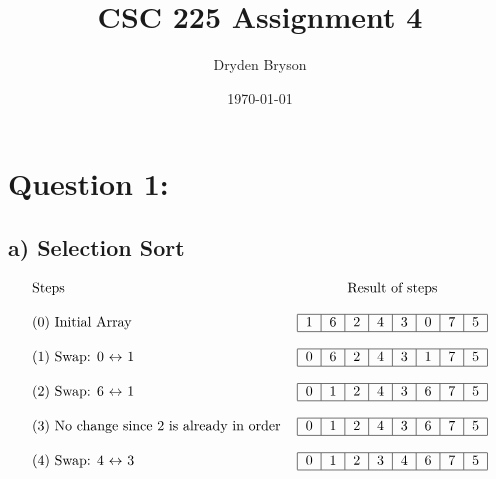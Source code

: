 \documentclass{article}
\title{CSC 225 Assignment 4}
\author{Dryden Bryson}
\date{\today}
\begin{document}
\maketitle
\newpage

\section*{Question 1:}
\subsection*{a) Selection Sort}
\begin{align}
    \begin{tabular}{l c}
        \text{Steps} & \text{Result of steps}\\&\\
        \text{(0) Initial Array\;\;\;\;\;\;\;\;}&\begin{tabular}{|c|c|c|c|c|c|c|c|c|}
            \hline
        1&6&2&4&3&0&7&5\\
            \hline
        \end{tabular}\\&\\
        \text{(1) Swap: 0 $\leftrightarrow$ 1}&\begin{tabular}{|c|c|c|c|c|c|c|c|}
            \hline
        0&6&2&4&3&1&7&5\\
            \hline
        \end{tabular}\\&\\
        \text{(2) Swap: 6 $\leftrightarrow$ 1}&\begin{tabular}{|c|c|c|c|c|c|c|c|}
            \hline
        0&1&2&4&3&6&7&5\\
            \hline
        \end{tabular}\\&\\
        \text{(3) No change since 2 is already in order}&\begin{tabular}{|c|c|c|c|c|c|c|c|}
            \hline
        0&1&2&4&3&6&7&5\\
            \hline
        \end{tabular}\\&\\
        \text{(4) Swap: 4 $\leftrightarrow$ 3}&\begin{tabular}{|c|c|c|c|c|c|c|c|}
            \hline
        0&1&2&3&4&6&7&5\\
            \hline
        \end{tabular}\\&\\

\end{tabular}
\end{align}
\end{document}
